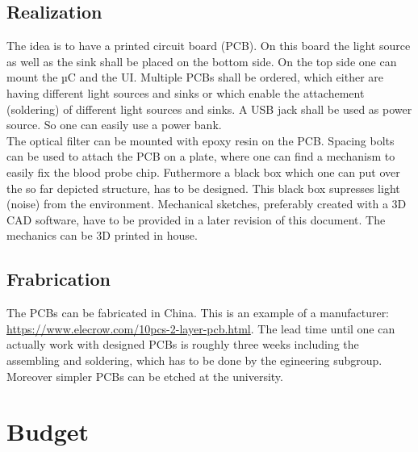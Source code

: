 \documentclass{report}
\newcommand{\newpar}{\vspace{1em}\\}
\begin{document}
\section{Realization}
The idea is to have a printed circuit board (PCB). On this board the light source as well as the sink shall be placed on the bottom side. On the top side one can mount the µC and the UI. Multiple PCBs shall be ordered, which either are having different light sources and sinks or which enable the attachement (soldering) of different light sources and sinks. A USB jack shall be used as power source. So one can easily use a power bank. 
\newpar
The optical filter can be mounted with epoxy resin on the PCB. Spacing bolts can be used to attach the PCB on a plate, where one can find a mechanism to easily fix the blood probe chip. Futhermore a black box which one can put over the so far depicted structure, has to be designed. This black box supresses light (noise) from the environment. Mechanical sketches, preferably created with a 3D CAD software, have to be provided in a later revision of this document. The mechanics can be 3D printed in house.     

\section{Frabrication}
The PCBs can be fabricated in China. This is an example of a manufacturer: \url{https://www.elecrow.com/10pcs-2-layer-pcb.html}. The lead time until one can actually work with designed PCBs is roughly three weeks including the assembling and soldering, which has to be done by the egineering subgroup. Moreover simpler PCBs can be etched at the university.    

\chapter{Budget}
\end{document}
